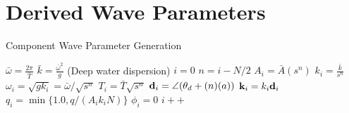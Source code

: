 \documentclass[11pt]{article}
\begin{document}
\section{Derived Wave Parameters}

\begin{algorithm}
  \caption{Component Wave Parameter Generation}
  \begin{algorithmic}
    \STATE $\bar{\omega} = \frac{2 \pi}{\bar{T}}$
    \STATE $\bar{k}= \frac{\bar{\omega}^2}{g}$ (Deep water dispersion)
    \STATE $i = 0$
    \STATE $n=i - N/2$
    \STATE $A_i = \bar{A} (s^n)$
    \STATE $k_i = \frac{\bar{k}}{s^n}$
    \STATE $\omega_i = \sqrt{g k_i} = \bar{\omega}/ \sqrt{s^n}$
    \STATE $T_i = \bar{T} \sqrt{s^n}$
    \STATE $\mbox{${\bf d}_{i}$} = \angle{(\theta_d + (n)(a))}$
    \STATE $\mbox{${\bf k}_{i}$} = k_i \mbox{${\bf d}_{i}$}$
    \STATE $q_i = \min{\{1.0, q/(A_i k_i N)\}}$
    \STATE $\phi_i = 0$
    \STATE $i++$
    \ENDFOR
  \end{algorithmic}
\end{algorithm}



\end{document}

